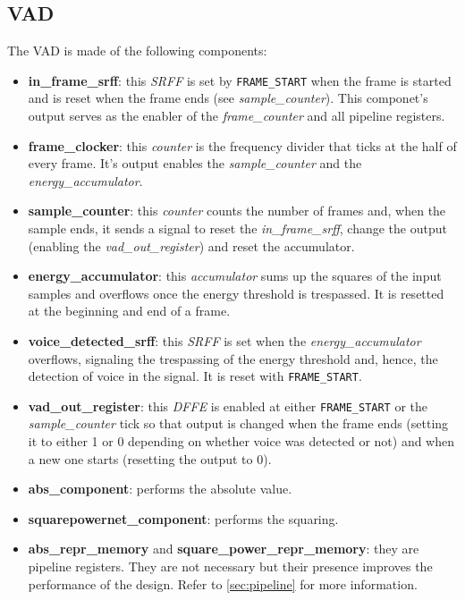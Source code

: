 \subsection{VAD}
The VAD is made of the following components:
\begin{itemize}
  \item \textbf{in\_frame\_srff}: this \emph{SRFF} is set by \texttt{FRAME\_START} when
    the frame is started and is reset when the frame ends (see \emph{sample\_counter}).
    This componet's output serves as the enabler of the \emph{frame\_counter}
    and all pipeline registers.
  \item \textbf{frame\_clocker}: this \emph{counter} is the frequency divider 
    that ticks at the half of every frame. It's output enables the 
    \emph{sample\_counter} and the \emph{energy\_accumulator}.
  \item \textbf{sample\_counter}: this \emph{counter} counts the number of frames
    and, when the sample ends, it sends a signal to reset the \emph{in\_frame\_srff},
    change the output (enabling the \emph{vad\_out\_register}) and reset the 
    accumulator.
  \item \textbf{energy\_accumulator}: this \emph{accumulator} sums up the 
    squares of the input samples and overflows once the energy threshold is 
    trespassed. It is resetted at the beginning and end of a frame.
  \item \textbf{voice\_detected\_srff}: this \emph{SRFF} is set when the 
    \emph{energy\_accumulator} overflows, signaling the trespassing of the 
    energy threshold and, hence, the detection of voice in the signal. It is 
    reset with \texttt{FRAME\_START}.
  \item \textbf{vad\_out\_register}: this \emph{DFFE} is enabled at either 
    \texttt{FRAME\_START} or the \emph{sample\_counter} tick so that output 
    is changed when the frame ends (setting it to either 1 or 0 depending on 
    whether voice was detected or not) and when a new one starts (resetting the 
    output to 0).
  \item \textbf{abs\_component}: performs the absolute value.
  \item \textbf{squarepowernet\_component}: performs the squaring.
  \item \textbf{abs\_repr\_memory} and \textbf{square\_power\_repr\_memory}: 
    they are pipeline registers. They are not necessary but their presence 
    improves the performance of the design. Refer to \cref{sec:pipeline} for 
    more information.
\end{itemize}

